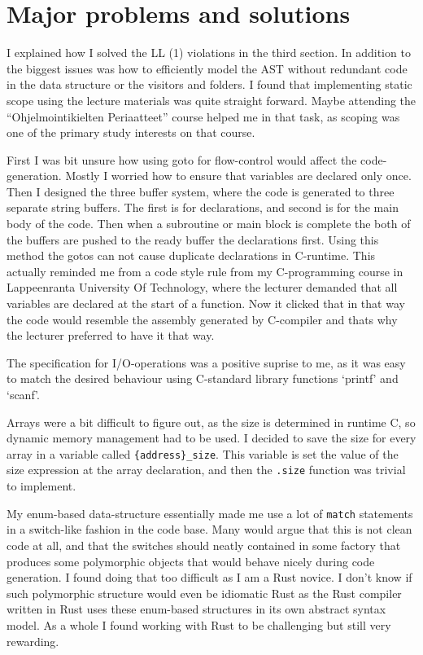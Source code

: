 \documentclass[12pt,a4paper]{article}
\begin{document}
\section{Major problems and solutions}

I explained how I solved the LL (1) violations in the third section.  In
addition to the biggest issues was how to efficiently model the AST without
redundant code in the data structure or the visitors and folders.  I found that
implementing static scope using the lecture materials was quite straight
forward.  Maybe attending the ``Ohjelmointikielten Periaatteet'' course helped me
in that task, as scoping was one of the primary study interests on that course.

First I was bit unsure how using goto for flow-control would affect the
code-generation.  Mostly I worried how to ensure that variables are declared
only once. Then I designed the three buffer system, where the code is generated
to three separate string buffers. The first is for declarations, and second is
for the main body of the code.  Then when a subroutine or main block is
complete the both of the buffers are pushed to the ready buffer the
declarations first. Using this method the gotos can not cause duplicate
declarations in C-runtime. This actually reminded me from a code style rule
from my C-programming course in Lappeenranta University Of Technology, where
the lecturer demanded that all variables are declared at the start of a
function. Now it clicked that in that way the code would resemble the assembly
generated by C-compiler and thats why the lecturer preferred to have it that
way.

The specification for I/O-operations was a positive suprise to me, as it was
easy to match the desired behaviour using C-standard library functions
`printf' and `scanf'.

Arrays were a bit difficult to figure out, as the size is determined in runtime
C, so dynamic memory management had to be used. I decided to save the size for
every array in a variable called \texttt{\{address\}\_size}.  This variable is
set the value of the size expression at the array declaration, and then the
\texttt{.size} function was trivial to implement.

My enum-based data-structure essentially made me use a lot of \texttt{match}
statements in a switch-like fashion in the code base. Many would argue that
this is not clean code at all, and that the switches should neatly contained in
some factory that produces some polymorphic objects that would behave nicely
during code generation.  I found doing that too difficult as I am a Rust
novice. I don't know if such polymorphic structure would even be idiomatic Rust
as the Rust compiler written in Rust uses these enum-based structures in its
own abstract syntax model. As a whole I found working with Rust to be
challenging but still very rewarding.
\end{document}

